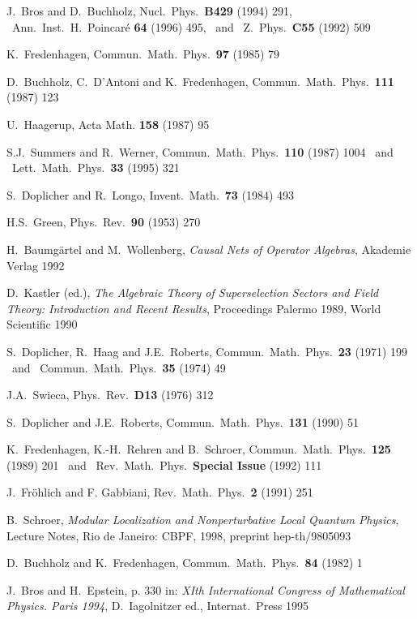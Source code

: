 \begin{thebibliography}{99}
 J.\ Bros and D.\ Buchholz,
Nucl.\ Phys.\ {\bf B429} (1994) 291, \
Ann.\ Inst.\ H.\ Poincar\'e {\bf 64} (1996) 495, \ and \ 
Z.\ Phys.\ {\bf C55} (1992) 509 

 K.\ Fredenhagen, Commun.\ Math.\ Phys.\ {\bf 97} (1985) 79

\bibitem{BuDaFr}
D.\ Buchholz, C.\ D'Antoni and K.\ Fredenhagen, 
Commun.\ Math.\ Phys.\ {\bf 111} (1987) 123

 U.\ Haagerup, 
Acta Math. {\bf 158} (1987) 95

S.J.\ Summers and R.\ Werner, Commun.\ Math.\ Phys.\ {\bf 110} (1987)
1004 \ and \ Lett.\ Math.\ Phys.\ {\bf 33} (1995) 321

 S.\ Doplicher and R.\ Longo, Invent.\ Math.\ {\bf 73}
(1984) 493

 H.S.\ Green, Phys.\ Rev.\ {\bf 90} (1953) 270

 H.\ Baumg\"artel and M.\ Wollenberg,
{\it Causal Nets of Operator Algebras}, 
Akademie Verlag 1992

 D.\ Kastler (ed.), 
{\it The Algebraic Theory of Superselection Sectors and Field Theory:
Introduction and Recent Results}, Proceedings Palermo 1989,  
World Scientific 1990
 
 S.\ Doplicher, R.\ Haag and J.E.\ Roberts, 
Commun.\ Math.\  Phys.\ {\bf 23} (1971) 199 \ and \ 
Commun.\ Math.\  Phys.\ {\bf 35} (1974) 49

\bibitem{Sw} J.A.\ Swieca, 
Phys.\ Rev.\ {\bf D13} (1976) 312

 S.\ Doplicher and J.E.\ Roberts,  
Commun.\ Math.\ Phys.\ {\bf 131} (1990) 51

\bibitem{FrReSch} K.\ Fredenhagen, K.-H.\ Rehren and B.\ Schroer, 
Commun.\ Math.\ Phys.\ {\bf 125} (1989) 201 \ and \ 
Rev.\ Math.\ Phys.\ {\bf Special Issue} (1992) 111  

\bibitem{Fro} 
J.\ Fr\"ohlich and F. Gabbiani,  
Rev.\ Math.\ Phys.\ {\bf 2} (1991) 251

\bibitem{Sch1}
B.\ Schroer, {\em Modular Localization and Nonperturbative Local
Quantum Physics}, Lecture Notes, Rio de Janeiro: CBPF, 1998,
preprint hep-th/9805093

\bibitem{BuFr} D.\ Buchholz and K.\ Fredenhagen, 
Commun.\ Math.\ Phys.\ {\bf 84} (1982) 1 

 J.\ Bros and H.\ Epstein, 
p. 330 in: {\em XIth International Congress of Mathematical
Physics. Paris 1994\/}, D.\ Iagolnitzer ed., Internat.\ Press 1995


\end{thebibliography}
